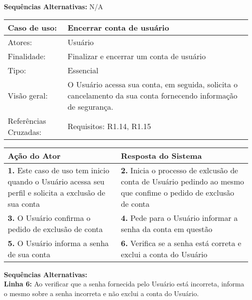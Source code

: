 \documentclass[12pt,a4paper,onecolumn,titlepage]{article}
\begin{document}
\textbf{Sequências Alternativas:} N/A

\newpage

\begin{table}[h!]
\begin{center}
\begin{tabular}{p{2.5cm} p{9.5cm}}
Caso de uso: & \textbf{Encerrar conta de usuário} \\ \hline
Atores: & Usuário \\ \hline
Finalidade: & Finalizar e encerrar um conta de usuário\\ \hline
Tipo: & Essencial \\ \hline
Visão geral: & O Usuário acessa sua conta, em seguida, solicita o cancelamento da sua conta fornecendo informação de segurança. \\ \hline
Referências Cruzadas: & Requisitos: R1.14, R1.15\\

\end{tabular}
\end{center}
\end{table} 

\begin{center}
\def\arraystretch{1.1}
\begin{tabular}{|p{6cm}|p{6cm}|}

\hline
\textbf{Ação do Ator} & \textbf{Resposta do Sistema} \\ \hline
\textbf{1.} Este caso de uso tem inicio quando o Usuário acessa seu perfil e solicita a exclusão de sua conta  & \textbf{2.} Inicia o processo de exlcusão de conta de Usuário pedindo ao mesmo que confime o pedido de exclusão de conta \\ \hline
\textbf{3.} O Usuário confirma o pedido de exclusão de conta  & \textbf{4.} Pede para o Usuário informar a senha da conta em questão  \\ \hline
\textbf{5.} O Usuário informa a senha de sua conta  & \textbf{6.} Verifica se a senha está correta e exclui a conta do Usuário\\ \hline
\end{tabular}
\end{center}

\textbf{Sequências Alternativas:} \\
\textbf{Linha 6:} Ao verificar que a senha fornecida pelo Usuário está incorreta, informa o mesmo sobre a senha incorreta e não exclui a conta do Usuário.
\end{document}
